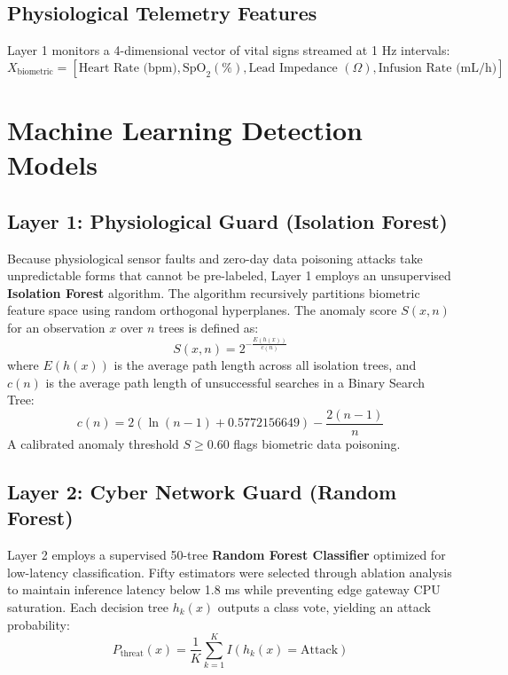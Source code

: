 \documentclass[12pt,a4paper]{report}
\begin{document}
\subsection{Physiological Telemetry Features}
Layer 1 monitors a 4-dimensional vector of vital signs streamed at 1 Hz intervals:
\begin{equation}
    X_{\text{biometric}} = \left[ \text{Heart Rate (bpm)}, \text{SpO}_2 (\%), \text{Lead Impedance } (\Omega), \text{Infusion Rate (mL/h)} \right]
\end{equation}

\section{Machine Learning Detection Models}
\subsection{Layer 1: Physiological Guard (Isolation Forest)}
Because physiological sensor faults and zero-day data poisoning attacks take unpredictable forms that cannot be pre-labeled, Layer 1 employs an unsupervised \textbf{Isolation Forest} algorithm. The algorithm recursively partitions biometric feature space using random orthogonal hyperplanes. The anomaly score $S(x, n)$ for an observation $x$ over $n$ trees is defined as:
\begin{equation}
    S(x, n) = 2^{-\frac{E(h(x))}{c(n)}}
\end{equation}
where $E(h(x))$ is the average path length across all isolation trees, and $c(n)$ is the average path length of unsuccessful searches in a Binary Search Tree:
\begin{equation}
    c(n) = 2 \left( \ln(n - 1) + 0.5772156649 \right) - \frac{2(n - 1)}{n}
\end{equation}
A calibrated anomaly threshold $S \ge 0.60$ flags biometric data poisoning.

\subsection{Layer 2: Cyber Network Guard (Random Forest)}
Layer 2 employs a supervised 50-tree \textbf{Random Forest Classifier} optimized for low-latency classification. Fifty estimators were selected through ablation analysis to maintain inference latency below 1.8 ms while preventing edge gateway CPU saturation. Each decision tree $h_k(x)$ outputs a class vote, yielding an attack probability:
\begin{equation}
    P_{\text{threat}}(x) = \frac{1}{K} \sum_{k=1}^{K} I(h_k(x) = \text{Attack})
\end{equation}
\end{document}
